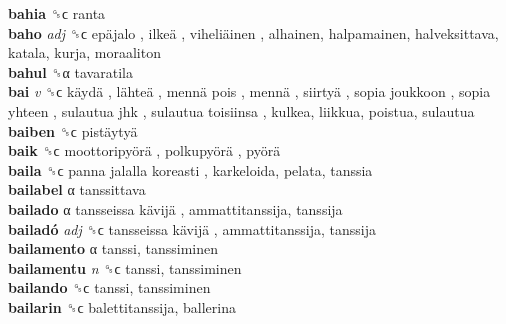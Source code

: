 \textbf{bahia} ␝ϲ  ranta  \\
\textbf{baho} \emph{adj}  ␝ϲ   epäjalo ,  ilkeä ,  viheliäinen , alhainen, halpamainen, halveksittava, katala, kurja, moraaliton  \\
\textbf{bahul} ␝α  tavaratila  \\
\textbf{bai} \emph{v}  ␝ϲ   käydä ,  lähteä ,  mennä pois ,  mennä ,  siirtyä ,  sopia joukkoon ,  sopia yhteen ,  sulautua jhk ,  sulautua toisiinsa , kulkea, liikkua, poistua, sulautua  \\
\textbf{baiben} ␝ϲ   pistäytyä   \\
\textbf{baik} ␝ϲ   moottoripyörä ,  polkupyörä ,  pyörä   \\
\textbf{baila} ␝ϲ   panna jalalla koreasti , karkeloida, pelata, tanssia  \\
\textbf{bailabel} α  tanssittava  \\
\textbf{bailado} α   tansseissa kävijä , ammattitanssija, tanssija  \\
\textbf{bailadó} \emph{adj}  ␝ϲ   tansseissa kävijä , ammattitanssija, tanssija  \\
\textbf{bailamento} α  tanssi, tanssiminen  \\
\textbf{bailamentu} \emph{n}  ␝ϲ  tanssi, tanssiminen  \\
\textbf{bailando} ␝ϲ  tanssi, tanssiminen  \\
\textbf{bailarin} ␝ϲ  balettitanssija, ballerina  \\
